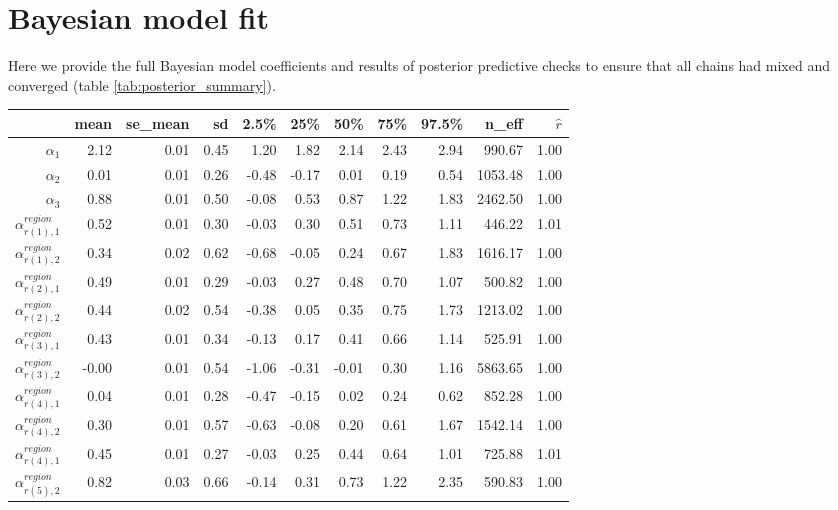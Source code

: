 \documentclass[12pt,english,a4paper]{article}
\begin{document}
\section{Bayesian model fit}

Here we provide the full Bayesian model coefficients and results of posterior predictive checks to ensure that all chains had mixed and converged (table \ref{tab:posterior_summary}).

\begin{table}[ht]
\centering
\tiny
\begin{tabular}{rrrrrrrrrrr}
  \hline
 & mean & se\_mean & sd & 2.5\% & 25\% & 50\% & 75\% & 97.5\% & n\_eff & $\hat{r}$ \\ 
  \hline
  $\alpha_1$ & 2.12 & 0.01 & 0.45 & 1.20 & 1.82 & 2.14 & 2.43 & 2.94 & 990.67 & 1.00 \\ 
  $\alpha_2$ & 0.01 & 0.01 & 0.26 & -0.48 & -0.17 & 0.01 & 0.19 & 0.54 & 1053.48 & 1.00 \\ 
  $\alpha_3$ & 0.88 & 0.01 & 0.50 & -0.08 & 0.53 & 0.87 & 1.22 & 1.83 & 2462.50 & 1.00 \\ 
  $\alpha_{r(1),1}^{region}$ & 0.52 & 0.01 & 0.30 & -0.03 & 0.30 & 0.51 & 0.73 & 1.11 & 446.22 & 1.01 \\ 
  $\alpha_{r(1),2}^{region}$ & 0.34 & 0.02 & 0.62 & -0.68 & -0.05 & 0.24 & 0.67 & 1.83 & 1616.17 & 1.00 \\ 
  $\alpha_{r(2),1}^{region}$ & 0.49 & 0.01 & 0.29 & -0.03 & 0.27 & 0.48 & 0.70 & 1.07 & 500.82 & 1.00 \\ 
  $\alpha_{r(2),2}^{region}$ & 0.44 & 0.02 & 0.54 & -0.38 & 0.05 & 0.35 & 0.75 & 1.73 & 1213.02 & 1.00 \\ 
  $\alpha_{r(3),1}^{region}$ & 0.43 & 0.01 & 0.34 & -0.13 & 0.17 & 0.41 & 0.66 & 1.14 & 525.91 & 1.00 \\ 
  $\alpha_{r(3),2}^{region}$ & -0.00 & 0.01 & 0.54 & -1.06 & -0.31 & -0.01 & 0.30 & 1.16 & 5863.65 & 1.00 \\ 
  $\alpha_{r(4),1}^{region}$ & 0.04 & 0.01 & 0.28 & -0.47 & -0.15 & 0.02 & 0.24 & 0.62 & 852.28 & 1.00 \\ 
  $\alpha_{r(4),2}^{region}$ & 0.30 & 0.01 & 0.57 & -0.63 & -0.08 & 0.20 & 0.61 & 1.67 & 1542.14 & 1.00 \\ 
  $\alpha_{r(4),1}^{region}$ & 0.45 & 0.01 & 0.27 & -0.03 & 0.25 & 0.44 & 0.64 & 1.01 & 725.88 & 1.01 \\ 
  $\alpha_{r(5),2}^{region}$ & 0.82 & 0.03 & 0.66 & -0.14 & 0.31 & 0.73 & 1.22 & 2.35 & 590.83 & 1.00 \\ 

\end{tabular}
\end{table}
\end{document}
